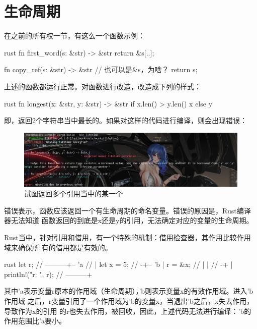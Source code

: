 \section{生命周期}
在之前的所有权一节，有这么一个函数示例：
\begin{code-block}{rust}
fn first_word(s: &str) -> &str {
    return &s[..];
}

fn copy_ref(s: &str) -> &str {
    // 也可以是&s，为啥？
    return s;
}
\end{code-block}
上述的函数都运行正常。对函数进行改造，改造成下列的样式：
\begin{code-block}{rust}
fn longest(x: &str, y: &str) -> &str {
    if x.len() > y.len() {
        x
    } else {
        y
    }
}
\end{code-block}
即，返回2个字符串当中最长的。如果对这样的代码进行编译，则会出现错误：
\begin{figure}[H]
  \centering
  \includegraphics[width=\linewidth]{rust_strref_err.png}
  \caption{试图返回多个引用当中的某一个}
  \label{fig:rust_strref_err}
\end{figure}
错误表示，函数应该返回一个有生命周期的命名变量。错误的原因是，Rust编译器无法知道
函数返回的到底是x还是y的引用，无法确定对应的变量的生命周期。

Rust当中，针对引用和借用，有一个特殊的机制：借用检查器，其作用比较作用域来确保所
有的借用都是有效的。
\begin{code-block}{rust}
{
    let r;                      // ---------+-- 'a
    {                            //          |
        let x = 5;             // -+-- 'b  |
        r = &x;                 //  |       |
    }                            // -+       |
    println!("r: {}", r); // ---------+
}
\end{code-block}

其中'a表示变量r原本的作用域（生命周期），'b则表示变量x的有效作用域。进入'b作用域
之后，r变量引用了一个作用域为'b的变量x，当退出'b之后，x失去作用，导致作为x的引用
的r也失去作用，被回收，因此，上述代码无法进行编译：'b的作用范围比'a要小。

